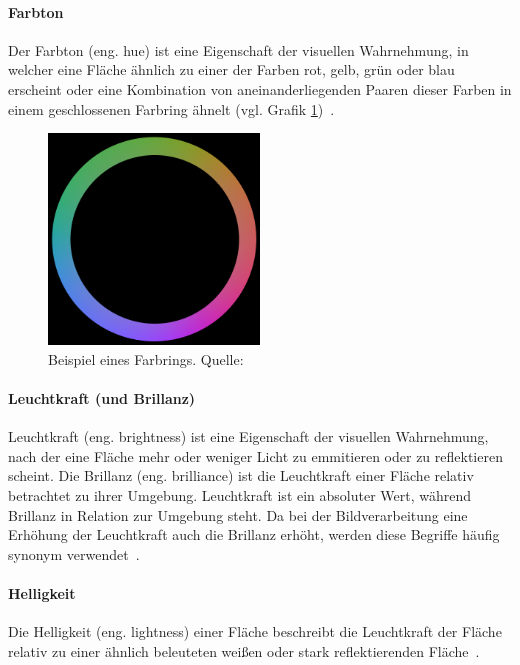 \documentclass[12pt, a4paper, ngerman]{article}
\begin{document}
\paragraph{Farbton}
Der Farbton (eng. hue) ist eine Eigenschaft der visuellen Wahrnehmung, in welcher eine Fläche 
ähnlich zu einer der Farben rot, gelb, grün oder blau erscheint oder eine Kombination von 
aneinanderliegenden Paaren dieser Farben in einem geschlossenen Farbring ähnelt (vgl. Grafik \ref{fig:Hue})~\cite{Darktable_2023}. 

\begin{figure}
  \centering
  \includegraphics[width=0.5\textwidth]{Grafiken/Farbring.png}
  \caption{Beispiel eines Farbrings. Quelle: \cite{Hue_2023}}
  \label{fig:Hue}
\end{figure}

\paragraph{Leuchtkraft (und Brillanz)}
Leuchtkraft (eng. brightness) ist eine Eigenschaft der visuellen Wahrnehmung, 
nach der eine Fläche mehr oder weniger Licht zu emmitieren oder zu reflektieren scheint. 
Die Brillanz (eng. brilliance) ist die Leuchtkraft einer Fläche relativ betrachtet zu ihrer Umgebung.
Leuchtkraft ist ein absoluter Wert, während Brillanz in Relation zur Umgebung steht.
Da bei der Bildverarbeitung eine Erhöhung der Leuchtkraft auch die Brillanz erhöht, 
werden diese Begriffe häufig synonym verwendet~\cite{Darktable_2023}.

\paragraph{Helligkeit}
Die Helligkeit (eng. lightness) einer Fläche beschreibt die Leuchtkraft der Fläche 
relativ zu einer ähnlich beleuteten weißen oder stark reflektierenden Fläche~\cite{Darktable_2023}.
\end{document}
